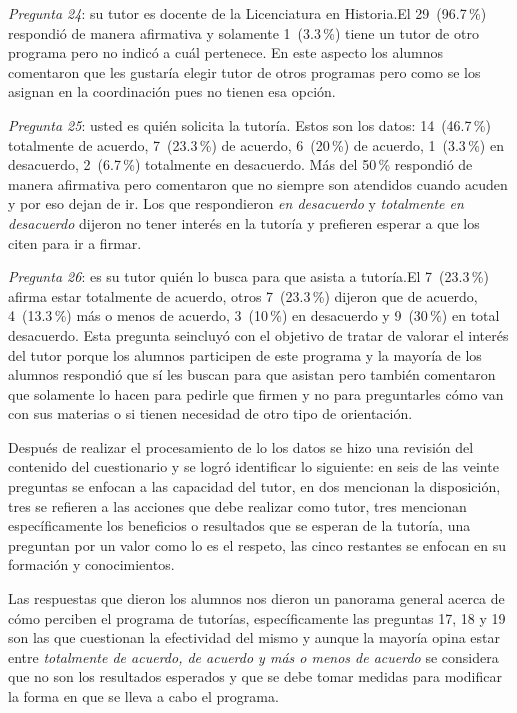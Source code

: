 \textit{Pregunta 24}: su tutor es docente de la Licenciatura en
Historia.\linebreak El 29~(96.7\,\%) respondió de manera afirmativa y solamente 1~(3.3\,\%)
tiene un tutor de otro programa pero no indicó a cuál pertenece. En este
aspecto los alumnos comentaron que les gustaría elegir tutor de otros
programas pero como se los asignan en la coordinación pues no tienen esa
opción.


\textit{Pregunta 25}: usted es quién solicita la tutoría. Estos son
los datos: 14~(46.7\,\%) totalmente de acuerdo, 7~(23.3\,\%) de acuerdo, 6~(20\,\%) 
de acuerdo, 1~(3.3\,\%) en desacuerdo, 2~(6.7\,\%) totalmente en
desacuerdo. Más del 50\,\% respondió de manera afirmativa pero comentaron que
no siempre son atendidos cuando acuden y por eso dejan de ir. Los que
respondieron \textit{en desacuerdo} y \textit{totalmente en desacuerdo}
dijeron no tener interés en la tutoría y prefieren esperar a que los citen
para ir a firmar.

\textit{Pregunta 26}: es su tutor quién lo busca para que asista a
tutoría.\linebreak El 7~(23.3\,\%) afirma estar totalmente de acuerdo, otros 7~(23.3\,\%)
dijeron que de acuerdo, 4~(13.3\,\%) más o menos de acuerdo, 3~(10\,\%) en
desacuerdo y 9~(30\,\%) en total desacuerdo. Esta pregunta se\linebreak incluyó con el
objetivo de tratar de valorar el interés del tutor porque los alumnos
participen de este programa y la mayoría de los alumnos respondió que sí
les buscan para que asistan pero también comentaron que solamente lo hacen
para pedirle que firmen y no para preguntarles cómo van con sus materias o
si tienen necesidad de otro tipo de orientación.

\smallskip
Después de realizar el procesamiento de lo los datos se hizo una revisión
del contenido del cuestionario y se logró identificar lo siguiente: en seis
de las veinte preguntas se  enfocan a las capacidad del tutor, en dos
mencionan la disposición, tres se refieren a las acciones que debe realizar
como tutor, tres mencionan específicamente los beneficios o resultados que
se esperan de la tutoría, una preguntan por un valor  como lo es el
respeto, las cinco restantes se enfocan en su  formación y conocimientos.


Las respuestas que dieron los alumnos nos dieron un panorama general acerca
de cómo perciben el programa de tutorías, específicamente las preguntas 17,
18 y 19 son las que cuestionan la efectividad del mismo y aunque la mayoría
opina estar entre \textit{totalmente de acuerdo, de acuerdo y más o menos
de acuerdo} se considera que no son los resultados esperados y que se debe
tomar medidas para modificar la forma en que se lleva a cabo el programa.


